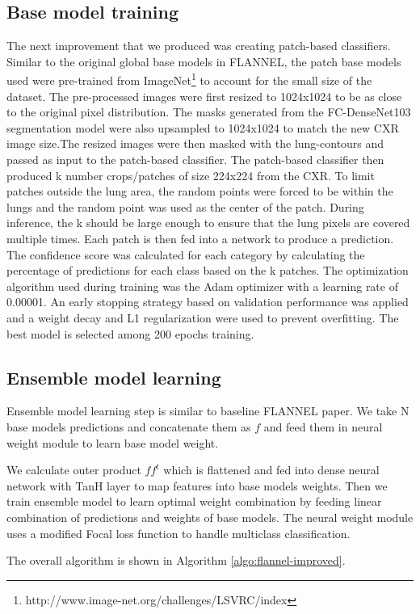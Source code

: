 \documentclass{sigkddExp}
\begin{document}
\subsection{Base model training}
The next improvement that we produced was creating patch-based classifiers.
Similar to the original global base models in FLANNEL, the patch base models
used were pre-trained from
ImageNet\footnote{http://www.image-net.org/challenges/LSVRC/index} to account
for the small size of the dataset. The pre-processed images were first resized
to 1024x1024 to be as close to the original pixel distribution. The masks
generated from the FC-DenseNet103 segmentation model were also upsampled to
1024x1024 to match the new CXR image size.The resized images were then masked
with the lung-contours and passed as input to the patch-based classifier. The
patch-based classifier then produced k number crops/patches of size 224x224 from
the CXR. To limit patches outside the lung area, the random points were forced
to be within the lungs and the random point was used as the center of the patch.
During inference, the k should be large enough to ensure that the lung pixels
are covered multiple times. Each patch is then fed into a network to produce a
prediction. The confidence score was calculated for each category by calculating
the percentage of predictions for each class based on the k patches. The
optimization algorithm used during training was the Adam optimizer with a
learning rate of 0.00001. An early stopping strategy based on validation
performance was applied and a weight decay and L1 regularization were used to
prevent overfitting. The best model is selected among 200 epochs training. 

\subsection{Ensemble model learning}
Ensemble model learning step is similar to baseline FLANNEL paper. We take
N base models predictions and concatenate them as $f$ and feed them in neural
weight module to learn base model weight.

We calculate outer product $ff^t$ which is flattened and fed into dense neural
network with TanH layer to map features into base models weights. Then we train
ensemble model to learn optimal weight combination by feeding linear combination
of predictions and weights of base models. The neural weight module uses a
modified Focal loss function to handle multiclass classification.

The overall algorithm is shown in Algorithm \ref{algo:flannel-improved}.
\end{document}
